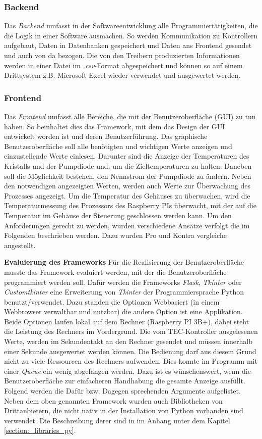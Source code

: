\subsubsection{Backend}
Das \textit{Backend} umfasst in der Softwareentwicklung alle Programmiertätigkeiten, die die Logik in einer Software ausmachen. So werden Kommunikation zu Kontrollern aufgebaut, Daten in Datenbanken gespeichert und Daten ans Frontend gesendet und auch von da bezogen.
Die von den Treibern produzierten Informationen werden in einer Datei im \textit{.csv}-Format abgespeichert und können so auf einem Drittsystem z.B. Microsoft Excel wieder verwendet und ausgewertet werden.

\subsubsection{Frontend}
Das \textit{Frontend} umfasst alle Bereiche, die mit der Benutzeroberfläche (GUI) zu tun haben. So beinhaltet dies das Framework, mit dem das Design der GUI entwickelt worden ist und deren Benutzerführung. 
Das graphische Benutzeroberfläche soll alle benötigten und wichtigen Werte anzeigen und einzustellende Werte einlesen. Darunter sind die Anzeige der Temperaturen des Kristalls und der Pumpdiode und, um die Zieltemperaturen zu halten. Daneben soll die Möglichkeit bestehen, den Nennstrom der Pumpdiode zu ändern. Neben den notwendigen angezeigten Werten, werden auch Werte zur Überwachung des Prozesses angezeigt. Um die Temperatur des Gehäuses zu überwachen, wird die Temperaturmessung des Prozessors des Raspberry PIs überwacht, mit der auf die Temperatur im Gehäuse der Steuerung geschlossen werden kann. Um den Anforderungen gerecht zu werden, wurden verschiedene Ansätze verfolgt die im Folgenden beschrieben werden. Dazu wurden Pro und Kontra vergleiche angestellt.

\textbf{Evaluierung des Frameworks}
Für die Realisierung der Benutzeroberfläche musste das Framework evaluiert werden, mit der die Benutzeroberfläche programmiert werden soll. Dafür werden die Frameworks \textit{Flask}, \textit{Tkinter} oder \textit{Customtkinter} eine Erweiterung von \textit{Tkinter} der Programmiersprache Python benutzt/verwendet. Dazu standen die Optionen Webbasiert (in einem Webbrowser verwaltbar und nutzbar) die andere Option ist eine Applikation. Beide Optionen laufen lokal auf dem Rechner (Raspberry PI 3B+), dabei steht die Leistung des Rechners im Vordergrund. Die vom TEC-Kontroller ausgelesenen Werte, werden im Sekundentakt an den Rechner gesendet und müssen innerhalb einer Sekunde ausgewertet werden können. Die Bedienung darf aus diesem Grund nicht zu viele Ressourcen des Rechners aufwenden. Dies konnte im Programm mit einer \textit{Queue} ein wenig abgefangen werden. Dazu ist es wünschenswert, wenn die Benutzeroberfläche zur einfacheren Handhabung die gesamte Anzeige ausfüllt. Folgend werden die Dafür bzw. Dagegen sprechenden Argumente aufgelistet.
Neben dem oben genannten Framework wurden auch Bibliotheken von Drittanbietern, die nicht nativ in der Installation von Python vorhanden sind verwendet. Die Beschreibung derer sind in im Anhang unter dem Kapitel \ref{section:_libraries_py}.

